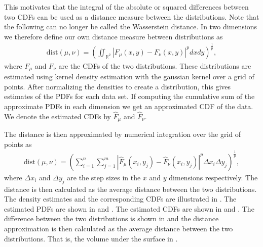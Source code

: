 \documentclass[%
a4paper,							
11pt,								
bibliography=totoc,						
abstracton=true					
]
{scrartcl}
\theoremstyle{plain}
\theoremstyle{definition}
\theoremstyle{remark}
\newcommand{\1}{\mathbbm{1}}
\begin{document}
This motivates that the integral of the absolute or squared differences between two \gls{CDF}s can be used as a distance measure between the distributions. Note that the following can no longer be called the Wasserstein distance. In two dimensions we therefore define our own distance measure between distributions as
\begin{align*}
    \mathrm{dist}(\mu,\nu) = \left(\iint_{\mathbb{R}^2} |F_\mu(x,y) - F_\nu(x,y)|^p dx dy \right) ^{\frac{1}{p}},
\end{align*}
where $F_\mu$ and $F_\nu$ are the \gls{CDF}s of the two distributions. These distributions are estimated using kernel density estimation with the gaussian kernel over a grid of points. After normalizing the densities to create a distribution, this gives estimates of the \gls{PDF}s for each data set. If computing the cumulative sum of the approximate \gls{PDF}s in each dimension we get an approximated \gls{CDF} of the data. We denote the estimated \gls{CDF}s by $\hat F_\mu$ and $\hat F_\nu$. 

The distance is then approximated by numerical integration over the grid of points as
\begin{align*}
    \mathrm{dist}(\mu,\nu) = \left( \sum_{i=1}^n \sum_{j=1}^m |\hat F_\mu(x_i,y_j) - \hat F_\nu(x_i,y_j)|^p \Delta x_i \Delta y_j \right)^{\frac{1}{p}},
\end{align*}
where $\Delta x_i$ and $\Delta y_j$ are the step sizes in the $x$ and $y$ dimensions respectively. The distance is then calculated as the average distance between the two distributions. The density estimates and the corresponding CDFs are illustrated in . The estimated \gls{PDF}s are shown in  and . The estimated \gls{CDF}s are shown in  and . The difference between the two distributions is shown in  and the distance approximation is then calculated as the average distance between the two distributions. That is, the volume under the surface in . 
\end{document}
